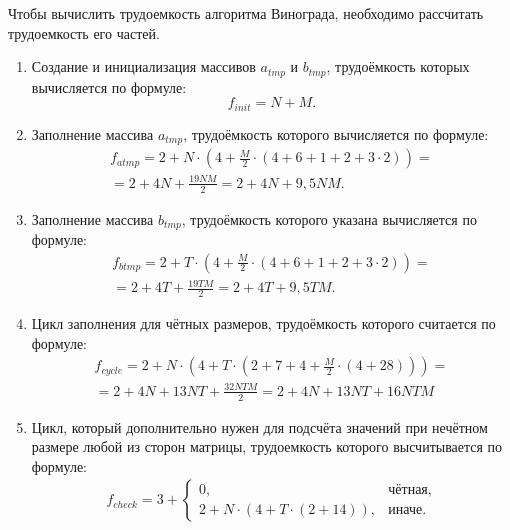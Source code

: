 Чтобы вычислить трудоемкость алгоритма Винограда, необходимо рассчитать трудоемкость его частей.
\begin{enumerate}
	\item Создание и инициализация массивов $a_{tmp}$ и $b_{tmp}$, трудоёмкость которых вычисляется по формуле:
	\begin{equation}
		\label{сomplexity:v_init}
		f_{init} = N + M.
	\end{equation}
	\item Заполнение массива $a_{tmp}$, трудоёмкость которого вычисляется по формуле:
	\begin{equation}
		\label{сomplexity:v_atmp}
		\begin{gathered}
			f_{atmp} = 2 + N \cdot (4 + \frac{M}{2} \cdot (4 + 6 + 1 + 2 + 3 \cdot 2)) = \\
			= 2 + 4N + \frac{19NM}{2} = 2 + 4N + 9,5NM.
		\end{gathered}
	\end{equation}
	\item Заполнение массива $b_{tmp}$, трудоёмкость которого указана вычисляется по формуле:
	\begin{equation}
		\label{сomplexity:v_btmp}
		\begin{gathered}
			f_{btmp} = 2 + T \cdot (4 + \frac{M}{2} \cdot (4 + 6 + 1 + 2 + 3 \cdot 2)) = \\
			= 2 + 4T + \frac{19TM}{2} = 2 + 4T + 9,5TM.
		\end{gathered}
	\end{equation}
	\item Цикл заполнения для чётных размеров, трудоёмкость которого считается по формуле:
	\begin{equation}
		\label{сomplexity:v_cycle}
		\begin{gathered}
			f_{cycle} = 2 + N \cdot (4 + T \cdot (2 + 7 + 4 + \frac{M}{2} \cdot (4 + 28))) = \\
			= 2 + 4N + 13NT + \frac{32NTM}{2}  = 2 + 4N + 13NT + 16NTM
		\end{gathered}
	\end{equation}
	\item Цикл, который дополнительно нужен для подсчёта значений при нечётном размере любой из сторон матрицы, трудоемкость которого высчитывается по формуле:
	\begin{equation}
		\label{сomplexity:v_check}
		\begin{gathered}
			f_{check} = 3 +
			\begin{cases}
				0, & \text{чётная}, \\
				2 + N \cdot (4 + T \cdot (2 + 14)), & \text{иначе}.
			\end{cases}
		\end{gathered}
	\end{equation}
\end{enumerate}

